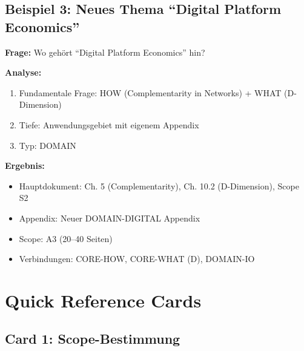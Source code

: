 \documentclass[12pt,a4paper]{article}
\begin{document}
\subsection{Beispiel 3: Neues Thema ``Digital Platform Economics''}

\begin{tcolorbox}[colback=blue!5!white, colframe=blue!50!black]
\textbf{Frage:} Wo gehört ``Digital Platform Economics'' hin?

\textbf{Analyse:}
\begin{enumerate}[nosep]
\item Fundamentale Frage: HOW (Complementarity in Networks) + WHAT (D-Dimension)
\item Tiefe: Anwendungsgebiet mit eigenem Appendix
\item Typ: DOMAIN
\end{enumerate}

\textbf{Ergebnis:}
\begin{itemize}[nosep]
\item Hauptdokument: Ch. 5 (Complementarity), Ch. 10.2 (D-Dimension), Scope S2
\item Appendix: Neuer DOMAIN-DIGITAL Appendix
\item Scope: A3 (20--40 Seiten)
\item Verbindungen: CORE-HOW, CORE-WHAT (D), DOMAIN-IO
\end{itemize}
\end{tcolorbox}

\section{Quick Reference Cards}

\subsection{Card 1: Scope-Bestimmung}
\end{document}
